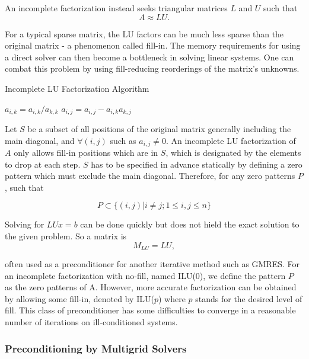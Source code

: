 {An incomplete factorization \cite{saad1994ilut,sertel2000incomplete, lee2003incomplete,malas2007incomplete} instead seeks triangular matrices $L$ and $U$ such that 
\[A \approx LU.\]

For a typical sparse matrix, the LU factors can be much less sparse than the original matrix - a phenomenon called fill-in. The memory requirements for using a direct solver can then become a bottleneck in solving linear systems. One can combat this problem by using fill-reducing reorderings of the matrix's unknowns. 

\begin{algorithm}[htbp]
	\caption{Incomplete LU Factorization Algorithm}
	\label{alg:ilu}
	\begin{algorithmic}[1]
					\State $a_{i,k} = a_{i,k}/a_{k,k}$
							\State $a_{i,j} = a_{i,j}-a_{i,k}a_{k,j}$
						\EndIf
					\EndFor
				\EndIf
			\EndFor
		\EndFor
	\end{algorithmic}
\end{algorithm}

Let $S$ be a subset of all positions of the original matrix generally including the main diagonal, and $\forall (i, j)$ such as $a_{i,j} \neq 0$. An incomplete LU factorization of $A$ only allows fill-in positions which are in $S$, which is designated by the elements to drop at each step. $S$ has to be specified in advance statically by defining a zero pattern which must exclude the main diagonal. Therefore, for any zero patterns $P$, such that

\begin{equation}
	P \subset \{ (i,j) | i \neq j; 1 \leq i,j\leq n\}
\end{equation}

Solving for $LUx=b$ can be done quickly but does not hield the exact solution to the given problem. So a matrix is \[M_{LU} = LU,\]

often used as a preconditioner for another iterative method such as GMRES. For an incomplete factorization with no-fill, named ILU(0), we define the pattern $P$ as the zero patterns of A. However, more accurate factorization can be obtained by allowing some fill-in, denoted by ILU($p$) where $p$ stands for the desired level of fill. This class of preconditioner has some difficulties to converge in a reasonable number of iterations on ill-conditioned systems.

\subsubsection{Preconditioning by Multigrid Solvers}

}
